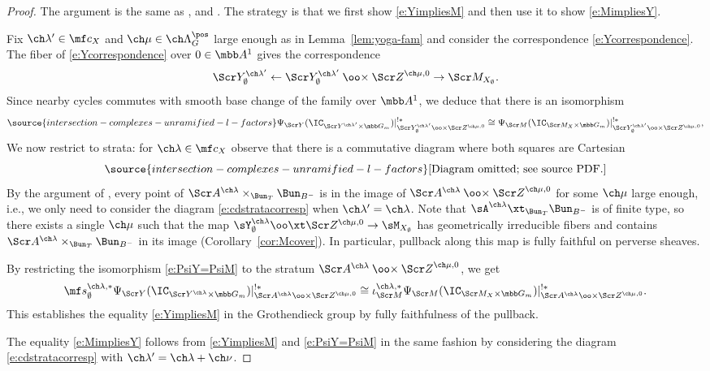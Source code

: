 \begin{proof}
The argument is the same as \cite[\S 3.1]{BFGM}, \cite[\S 8(1)]{BFGM-erratum}
and \cite[Proof of Proposition 4.4]{BG2}.
The strategy is that we first show \eqref{e:YimpliesM} and then use it to show \eqref{e:MimpliesY}.

Fix $\ch\lambda'\in \mf c_X$ and $\ch\mu\in \ch\Lambda^\pos_G$ large enough as in Lemma~\ref{lem:yoga-fam}
and consider the correspondence \eqref{e:Ycorrespondence}.
The fiber of \eqref{e:Ycorrespondence} over $0\in \mbb A^1$
gives the correspondence
\[ \Scr Y^{\ch\lambda'}_\emptyset \leftarrow \Scr Y^{\ch\lambda'}_\emptyset \mathbin{\oo\times} {\Scr Z}^{\ch\mu,0} \to \Scr M_{X_\emptyset}. \]
Since nearby cycles commutes with smooth base change of the family over $\mbb A^1$,
we deduce that there is an isomorphism
\begin{equation} \label{e:PsiY=PsiM}
\source{intersection-complexes-unramified-l-factors}
 \Psi_{\Scr Y}(\IC_{\Scr Y^{\ch\lambda'}\times\mbb G_m})|^{!*}_{\Scr Y^{\ch\lambda'}_\emptyset
\oo\times {\Scr Z}^{\ch\mu,0}} \cong \Psi_{\Scr M}(\IC_{\Scr M_X\times \mbb G_m})|^{!*}_{\Scr Y^{\ch\lambda'}_\emptyset \oo\times {\Scr Z}^{\ch\mu,0}},
\end{equation}
We now restrict to strata: for $\ch\lambda\in \mf c_X$ observe that there is a commutative diagram
where both squares are Cartesian
\begin{equation} \label{e:cdstratacorresp}
\source{intersection-complexes-unramified-l-factors}
\text{[Diagram omitted; see source PDF.]}
\end{equation}
By the argument of \cite[\S 8(1)]{BFGM}, every point of
$\Scr A^{\ch\lambda} \times_{\Bun_T}\Bun_{B^-}$ is in
the image of $\Scr A^{\ch\lambda} \mathbin{\oo\times} {\Scr Z}^{\ch\mu,0}$
for some $\ch\mu$ large enough, i.e., we only need to consider the diagram
\eqref{e:cdstratacorresp} when $\ch\lambda'=\ch\lambda$.
Note that $\sA^{\ch\lambda}\xt_{\Bun_T} \Bun_{B^-}$ is of finite type, so
there exists a single $\ch\mu$ such that the map
$\sY^{\ch\lambda}_\emptyset \oo\xt \Scr Z^{\ch\mu,0} \to \sM_{X_\emptyset}$
has geometrically irreducible fibers and
contains $\Scr A^{\ch\lambda} \times_{\Bun_T}\Bun_{B^-}$ in its image (Corollary~\ref{cor:Mcover}).
In particular, pullback along this map is fully faithful on perverse sheaves.

By restricting the isomorphism \eqref{e:PsiY=PsiM} to the stratum
$\Scr A^{\ch\lambda} \mathbin{\oo\times} {\Scr Z}^{\ch\mu,0}$, we get
\[
    \mf s_\emptyset^{\ch\lambda,*}\Psi_{\Scr Y}(\IC_{\Scr Y^{\ch\lambda}\times\mbb G_m})|^{!*}_{\Scr A^{\ch\lambda} \oo\times {\Scr Z}^{\ch\mu,0}} \cong \iota^{\ch\lambda,*}_{\Scr M}\Psi_{\Scr M}(\IC_{\Scr M_X\times \mbb G_m})|^{!*}_{\Scr A^{\ch\lambda} \oo\times {\Scr Z}^{\ch\mu,0}}.
\]
This establishes the equality \eqref{e:YimpliesM} in the Grothendieck group
by fully faithfulness of the pullback.

The equality \eqref{e:MimpliesY} follows from \eqref{e:YimpliesM} and \eqref{e:PsiY=PsiM}
in the same fashion by considering the diagram \eqref{e:cdstratacorresp} with
$\ch\lambda'=\ch\lambda+\ch\nu$.
\end{proof}

